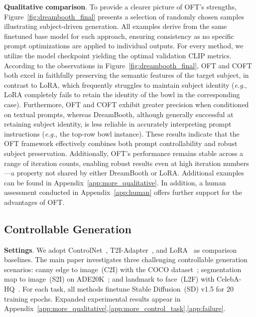 \textbf{Qualitative comparison}. To provide a clearer picture of OFT’s strengths, Figure~\ref{fig:dreambooth_final} presents a selection of randomly chosen samples illustrating subject-driven generation. All examples derive from the same finetuned base model for each approach, ensuring consistency as no specific prompt optimizations are applied to individual outputs. For every method, we utilize the model checkpoint yielding the optimal validation CLIP metrics. According to the observations in Figure~\ref{fig:dreambooth_final}, OFT and COFT both excel in faithfully preserving the semantic features of the target subject, in contrast to LoRA, which frequently struggles to maintain subject identity (\emph{e.g.}, LoRA completely fails to retain the identity of the bowl in the corresponding case). Furthermore, OFT and COFT exhibit greater precision when conditioned on textual prompts, whereas DreamBooth, although generally successful at retaining subject identity, is less reliable in accurately interpreting prompt instructions (\emph{e.g.}, the top-row bowl instance). These results indicate that the OFT framework effectively combines both prompt controllability and robust subject preservation. Additionally, OFT’s performance remains stable across a range of iteration counts, enabling robust results even at high iteration numbers—a property not shared by either DreamBooth or LoRA. Additional examples can be found in Appendix~\ref{app:more_qualitative}. In addition, a human assessment conducted in Appendix~\ref{app:human} offers further support for the advantages of OFT.

\subsection{Controllable Generation}

\textbf{Settings}. We adopt ControlNet~\cite{zhang2023adding}, T2I-Adapter~\cite{mou2023t2i}, and LoRA~\cite{hulora2022} as comparison baselines. The main paper investigates three challenging controllable generation scenarios: canny edge to image~(C2I) with the COCO dataset~\cite{lin2014microsoft}; segmentation map to image~(S2I) on ADE20K~\cite{zhou2017scene}; and landmark to face~(L2F) with CelebA-HQ~\cite{karras2018progressive,xia2021tedigan}. For each task, all methods finetune Stable Diffusion~(SD) v1.5 for 20 training epochs. Expanded experimental results appear in Appendix~\ref{app:more_qualitative},\ref{app:more_control_task},\ref{app:failure}.

